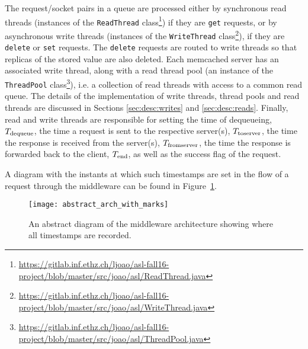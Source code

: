 \documentclass[11pt]{article}
\begin{document}
The request/socket pairs in a queue are processed either by synchronous read threads (instances of the \texttt{ReadThread} class\footnote{\url{https://gitlab.inf.ethz.ch/ljoao/asl-fall16-project/blob/master/src/joao/asl/ReadThread.java}}) if they are \texttt{get} requests, or by asynchronous write threads (instances of the \texttt{WriteThread} class\footnote{\url{https://gitlab.inf.ethz.ch/ljoao/asl-fall16-project/blob/master/src/joao/asl/WriteThread.java}}), if they are \texttt{delete} or \texttt{set} requests. The \texttt{delete} requests are routed to write threads so that replicas of the stored value are also deleted. Each memcached server has an associated write thread, along with a read thread pool (an instance of the \texttt{ThreadPool} class\footnote{\url{https://gitlab.inf.ethz.ch/ljoao/asl-fall16-project/blob/master/src/joao/asl/ThreadPool.java}}), i.e. a collection of read threads with access to a common read queue. The details of the implementation of write threads, thread pools and read threads are discussed in Sections \ref{sec:desc:writes} and \ref{sec:desc:reads}. Finally, read and write threads are responsible for setting the time of dequeueing, $T_{\textnormal{dequeue}}$, the time a request is sent to the respective server(s), $T_{\textnormal{toserver}}$, the time the response is received from the server(s), $T_{\textnormal{fromserver}}$, the time the response is forwarded back to the client, $T_{\textnormal{end}}$, as well as the success flag of the request.

A diagram with the instants at which such timestamps are set in the flow of a request through the middleware can be found in Figure~\ref{diag}.

\begin{figure}[H]
	\centering
	\texttt{[image: abstract\_arch\_with\_marks]}
	\caption{An abstract diagram of the middleware architecture showing where all timestamps are recorded.}
	\label{diag}
\end{figure}

%
%
\end{document}
